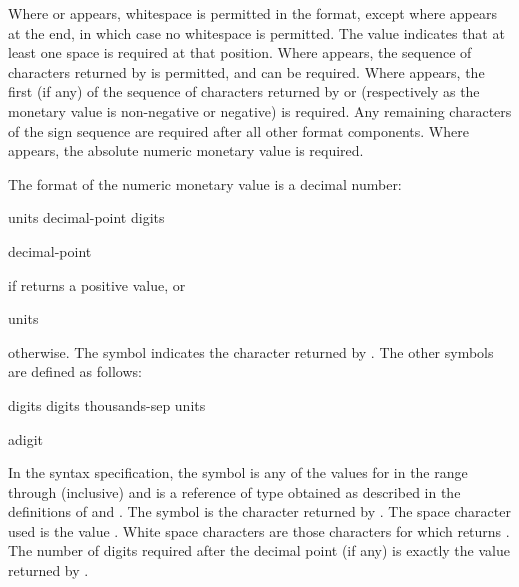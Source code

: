 \pnum
Where  or  appears,
whitespace is permitted in the format,
except where  appears at the end,
in which case no whitespace is permitted.
The value  indicates that
at least one space is required at that position.
Where  appears,
the sequence of characters returned by  is permitted, and
can be required.
Where  appears,
the first (if any) of the sequence of characters returned by
 or 
(respectively as the monetary value is non-negative or negative) is required.
Any remaining characters of the sign sequence are required after
all other format components.
Where  appears, the absolute numeric monetary value is required.

\pnum
The format of the numeric monetary value is a decimal number:
\begin{ncbnf}
\br
    units \br
    decimal-point digits
\end{ncbnf}
\begin{ncbnf}
\br
    decimal-point 
\end{ncbnf}
if  returns a positive value, or
\begin{ncbnf}
\br
    units
\end{ncbnf}
otherwise.
The symbol 
indicates the character returned by .
The other symbols are defined as follows:

\begin{ncbnf}
\br
    digits\br
    digits thousands-sep units
\end{ncbnf}

\begin{ncbnf}
\br
    adigit 
\end{ncbnf}

In the syntax specification,
the symbol  is any of the values 
for  in the range  through  (inclusive) and
 is a reference of type 
obtained as described in the definitions
of  and .
The symbol 
is the character returned by .
The space character used is the value .
White space characters are those characters 
for which  returns .
The number of digits required after the decimal point (if any)
is exactly the value returned by .

